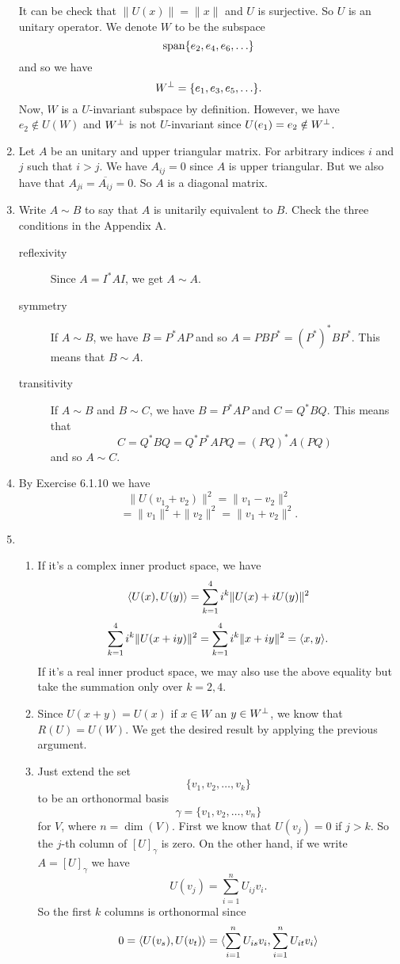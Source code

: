 \begin{enumerate}
It can be check that $\|U(x)\|=\|x\|$ and $U$ is surjective. So $U$ is an unitary operator. We denote $W$ to be the subspace 
\[\sp\{e_2,e_4,e_6, \ldots\}\]
and so we have 
\[W\pp=\{e_1,e_3,e_5,\ldots \}.\]
Now, $W$ is a $U$-invariant subspace by definition. However, we have $e_2\notin U(W)$ and $W\pp$ is not $U$-invariant since $U(e_1)=e_2\notin W\pp$.
\item Let $A$ be an unitary and upper triangular matrix. For arbitrary indices $i$ and $j$ such that $i> j$. We have $A_{ij}=0$ since $A$ is upper triangular. But we also have that $A_{ji}=\overline{A_{ij}}=0$. So $A$ is a diagonal matrix.
\item Write $A\sim B$ to say that $A$ is unitarily equivalent to $B$. Check the three conditions in the Appendix A. \begin{description}
\item[reflexivity] Since $A=I^*AI$, we get $A\sim A$.
\item[symmetry]  If $A\sim B$, we have $B=P^*AP$ and so $A=PBP^*=(P^*)^*BP^*$. This means that $B\sim A$.
\item[transitivity] If $A\sim B$ and $B\sim C$, we have $B=P^*AP$ and $C=Q^*BQ$. This means that 
\[C=Q^*BQ=Q^*P^*APQ=(PQ)^*A(PQ)\]
and so $A\sim C$.
\end{description}
\item By Exercise 6.1.10 we have 
\[\|U(v_1+v_2)\|^2=\|v_1-v_2\|^2\]
\[=\|v_1\|^2+\|v_2\|^2=\|v_1+v_2\|^2.\]
\item \begin{enumerate}
\item If it's a complex inner product space, we have 
\[\lag U(x),U(y)\rag =\sum_{k=1}^4{i^k\|U(x)+iU(y)\|^2}\]
\[\sum_{k=1}^4{i^k\|U(x+iy)\|^2}=\sum_{k=1}^4{i^k\|x+iy\|^2}=\lag x,y\rag.\]
If it's a real inner product space, we may also use the above equality but take the summation only over $k=2,4$.
\item Since $U(x+y)=U(x)$ if $x\in W$ an $y\in W\pp$, we know that $R(U)=U(W)$. We get the desired result by applying the previous argument.
\item Just extend the set 
\[\{v_1,v_2,\ldots ,v_k\}\] to be an orthonormal basis 
\[\gamma =\{v_1,v_2,\ldots ,v_n\}\]
for $V$, where $n=\dim(V)$. First we know that $U(v_j)=0$ if $j>k$. So the $j$-th column of $[U]_{\gamma}$ is zero. On the other hand, if we write $A=[U]_{\gamma}$ we have 
\[U(v_j)=\sum_{i=1}^n{U_{ij}v_i}.\]
So the first $k$ columns is orthonormal since 
\[0=\lag U(v_s),U(v_t)\rag =\lag \sum_{i=1}^n{U_{is}v_i},\sum_{i=1}^n{U_{it}v_i}\rag \]

\end{enumerate}
\end{enumerate}
